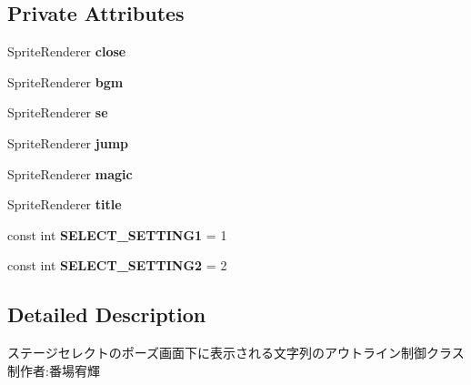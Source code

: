 \subsection*{Private Attributes}
\begin{DoxyCompactItemize}
\item 
\mbox{\label{class_stage_select_pause_string_outline_a59b155fc707cc5abd4847a4c593038d5}} 
Sprite\+Renderer {\bfseries close}
\item 
\mbox{\label{class_stage_select_pause_string_outline_a0c0c76f8f6f4ee9ea2576b6a407392f9}} 
Sprite\+Renderer {\bfseries bgm}
\item 
\mbox{\label{class_stage_select_pause_string_outline_add23477d2bbaaa08dcdc16d1ea4b5a87}} 
Sprite\+Renderer {\bfseries se}
\item 
\mbox{\label{class_stage_select_pause_string_outline_a0214e0139813b5d06c9ec75fc215dfa0}} 
Sprite\+Renderer {\bfseries jump}
\item 
\mbox{\label{class_stage_select_pause_string_outline_a36acc23d13a28b72e4de3243d660e4a2}} 
Sprite\+Renderer {\bfseries magic}
\item 
\mbox{\label{class_stage_select_pause_string_outline_a36f42c426458ca69c09881e1b444e5a7}} 
Sprite\+Renderer {\bfseries title}
\item 
\mbox{\label{class_stage_select_pause_string_outline_ad0e48b78a4f7bdce9fa26e9f1d4b1cea}} 
const int {\bfseries S\+E\+L\+E\+C\+T\+\_\+\+S\+E\+T\+T\+I\+N\+G1} = 1
\item 
\mbox{\label{class_stage_select_pause_string_outline_af1abbc8f0630da512962a628c7b82605}} 
const int {\bfseries S\+E\+L\+E\+C\+T\+\_\+\+S\+E\+T\+T\+I\+N\+G2} = 2
\end{DoxyCompactItemize}


\subsection{Detailed Description}
ステージセレクトのポーズ画面下に表示される文字列のアウトライン制御クラス 制作者\+:番場宥輝 



